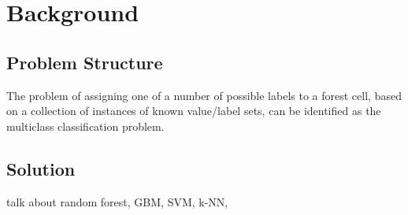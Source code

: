 \section{Background}
\label{sec:-back}
\subsection{Problem Structure}
The problem of assigning one of a number of possible labels to a 
forest cell, based on a collection of instances of known value/label 
sets, can be identified as the multiclass classification problem.


\subsection{Solution}
talk about random forest, GBM, SVM, k-NN, 

\subsection{}

